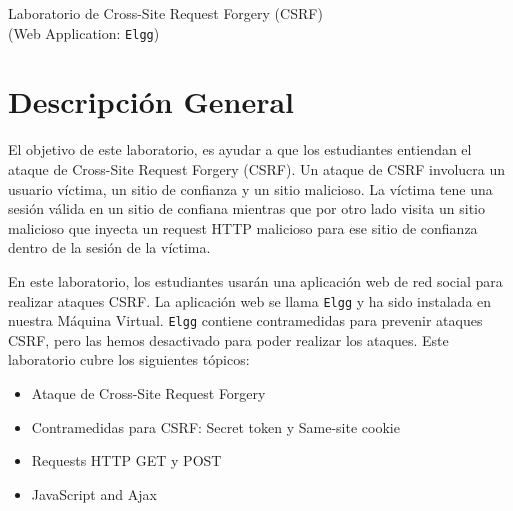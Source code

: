 
\newcommand{\commonfolder}{../../common-files}
\newcommand{\webcommon}{../Web_Common}








\begin{center}
{\LARGE Laboratorio de Cross-Site Request Forgery (CSRF)}
\vspace{0.1in}\\
{\Large (Web Application: {\tt Elgg})}
\end{center}




\section{Descripción General}


El objetivo de este laboratorio, es ayudar a que los estudiantes entiendan el ataque de Cross-Site Request Forgery (CSRF). Un ataque de CSRF involucra un usuario víctima, un sitio de confianza y un sitio malicioso. La víctima tene una sesión válida en un sitio de confiana mientras que por otro lado visita un sitio malicioso que inyecta un request HTTP malicioso para ese sitio de confianza dentro de la sesión de la víctima.

En este laboratorio, los estudiantes usarán una aplicación web de red social para realizar ataques CSRF. La aplicación web se llama \texttt{Elgg} y ha sido instalada en nuestra Máquina Virtual. 
\texttt{Elgg} contiene contramedidas para prevenir ataques CSRF, pero las hemos desactivado para poder realizar los ataques.
Este laboratorio cubre los siguientes tópicos:


\begin{itemize}[noitemsep]
 \item Ataque de Cross-Site Request Forgery 
 \item Contramedidas para CSRF: Secret token y Same-site cookie
 \item Requests HTTP GET y POST
 \item JavaScript and Ajax
\end{itemize}


